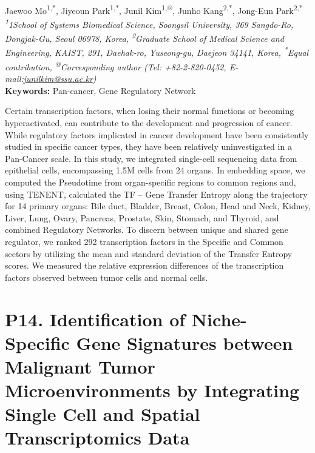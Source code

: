 \begin{center}
Jaewoo Mo\textsuperscript{1,*}, Jiyeoun Park\textsuperscript{1,*}, Junil Kim\href{https://orcid.org/0000-0002-1202-1808}{\textcolor{orcidlogocol}{\aiOrcid}}\textsuperscript{1,@}, Junho Kang\textsuperscript{2,*}, Jong-Eun Park\textsuperscript{2,*} \\
\vspace{0.2cm}
\textit{\textsuperscript{1}1School of Systems Biomedical Science, Soongsil University, 369 Sangdo-Ro, Dongjak-Gu, Seoul 06978, Korea, \textsuperscript{2}Graduate School of Medical Science and Engineering, KAIST, 291, Daehak-ro, Yuseong-gu, Daejeon 34141, Korea, \textsuperscript{*}Equal contribution, \textsuperscript{@}Corresponding author (Tel: +82-2-820-0452, E-mail:\href{mailto:junilkim@ssu.ac.kr}{junilkim@ssu.ac.kr})} \\
\vspace{0.2cm}
\textbf{Keywords:} Pan-cancer, Gene Regulatory Network
\end{center}

\noindent
Certain transcription factors, when losing their normal functions or becoming hyperactivated, can contribute to the development and progression of cancer. While regulatory factors implicated in cancer development have been consistently studied in specific cancer types, they have been relatively uninvestigated in a Pan-Cancer scale. In this study, we integrated single-cell sequencing data from epithelial cells, encompassing 1.5M cells from 24 organs. In embedding space, we computed the Pseudotime from organ-specific regions to common regions and, using TENENT, calculated the TF – Gene Transfer Entropy along the trajectory for 14 primary organs: Bile duct, Bladder, Breast, Colon, Head and Neck, Kidney, Liver, Lung, Ovary, Pancreas, Prostate, Skin, Stomach, and Thyroid, and combined Regulatory Networks. To discern between unique and shared gene regulator, we ranked 292 transcription factors in the Specific and Common sectors by utilizing the mean and standard deviation of the Transfer Entropy scores. We measured the relative expression differences of the transcription factors observed between tumor cells and normal cells.
\newpage


\section*{P14. Identification of Niche-Specific Gene Signatures between Malignant Tumor Microenvironments by Integrating Single Cell and Spatial Transcriptomics Data}

